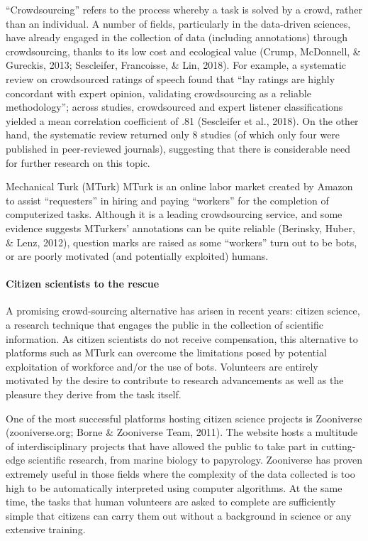 \documentclass[english,,man]{apa6}
\begin{document}
\enquote{Crowdsourcing} refers to the process whereby a task is solved by a crowd, rather than an individual. A number of fields, particularly in the data-driven sciences, have already engaged in the collection of data (including annotations) through crowdsourcing, thanks to its low cost and ecological value (Crump, McDonnell, \& Gureckis, 2013; Sescleifer, Francoisse, \& Lin, 2018). For example, a systematic review on crowdsourced ratings of speech found that \enquote{lay ratings are highly concordant with expert opinion, validating crowdsourcing as a reliable methodology}; across studies, crowdsourced and expert listener classifications yielded a mean correlation coefficient of .81 (Sescleifer et al., 2018). On the other hand, the systematic review returned only 8 studies (of which only four were published in peer-reviewed journals), suggesting that there is considerable need for further research on this topic.

Mechanical Turk (MTurk) MTurk is an online labor market created by Amazon to assist \enquote{requesters} in hiring and paying \enquote{workers} for the completion of computerized tasks. Although it is a leading crowdsourcing service, and some evidence suggests MTurkers' annotations can be quite reliable (Berinsky, Huber, \& Lenz, 2012), question marks are raised as some \enquote{workers} turn out to be bots, or are poorly motivated (and potentially exploited) humans.

\hypertarget{citizen-scientists-to-the-rescue}{%
\paragraph{Citizen scientists to the rescue}\label{citizen-scientists-to-the-rescue}}

A promising crowd-sourcing alternative has arisen in recent years: citizen science, a research technique that engages the public in the collection of scientific information. As citizen scientists do not receive compensation, this alternative to platforms such as MTurk can overcome the limitations posed by potential exploitation of workforce and/or the use of bots. Volunteers are entirely motivated by the desire to contribute to research advancements as well as the pleasure they derive from the task itself.

One of the most successful platforms hosting citizen science projects is Zooniverse (zooniverse.org; Borne \& Zooniverse Team, 2011). The website hosts a multitude of interdisciplinary projects that have allowed the public to take part in cutting-edge scientific research, from marine biology to papyrology. Zooniverse has proven extremely useful in those fields where the complexity of the data collected is too high to be automatically interpreted using computer algorithms. At the same time, the tasks that human volunteers are asked to complete are sufficiently simple that citizens can carry them out without a background in science or any extensive training.
\end{document}
